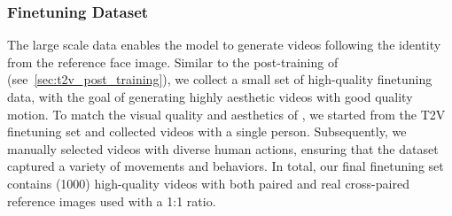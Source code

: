 \subsubsection{Finetuning Dataset}
The large scale \pretraining data enables the model to generate videos following the identity from the reference face image.
Similar to the post-training of \OursVideo (see~\cref{sec:t2v_post_training}), we collect a small set of high-quality finetuning data, with the goal of generating highly aesthetic videos with good quality motion.
To match the visual quality and aesthetics of \OursVideo, we started from the T2V finetuning set and collected videos with a single person.
Subsequently, we manually selected videos with diverse human actions, ensuring that the dataset captured a variety of movements and behaviors.
In total, our final finetuning set contains \bigO(1000) high-quality videos with both paired and real cross-paired reference images used with a 1:1 ratio.
